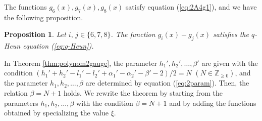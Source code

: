 \documentclass[12pt]{amsart}
\numberwithin{equation}{section}
\newtheorem{prop}[thm]{Proposition}
\theoremstyle{definition}
\theoremstyle{remark}
\begin{document}
The functions $g_6 (x) , g_7 (x) , g_8 (x) $ satisfy equation (\ref{eq:2A4g1}), and we have the following proposition.
\begin{prop}
Let $i, \, j \in \{6, 7, 8\}$.
The function $g_i (x) - g_{j} (x) $ satisfies the $q$-Heun equation (\ref{eq:q-Heun}).
\end{prop}

In Theorem \ref{thm:polynom2gauge}, the parameter $h_{1}' ,h_{2}', \dots ,\beta' $ are given with the condition $( h_{1}' + h_{2}' -l_{1}' - l_{2}' + \alpha_{1}' - \alpha_{2}' - \beta' - 2)/2 =N$ $(N \in {\mathbb Z}_{\geq 0})$, and the parameter $h_{1} ,h_{2}, \dots ,\beta $ are determined by equation (\ref{eq:2param}).
Then, the relation $\beta = N +1 $ holds.
We rewrite the theorem by starting from the parameters $h_{1} ,h_{2}, \dots ,\beta $ with the condition $\beta = N +1  $ and by adding the functions obtained by specializing the value $\xi $.
\end{document}
